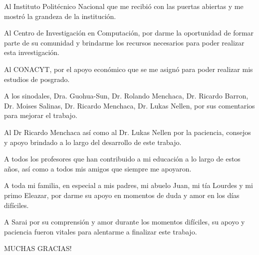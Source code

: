 \begin{acknowledgements}
\addchaptertocentry{\acknowledgementname} 

Al Instituto Politécnico Nacional que me recibió con las puertas abiertas y me mostró la grandeza de la institución. 

Al Centro de Investigación en Computación, por darme la oportunidad de formar parte de su comunidad y brindarme los recursos necesarios para poder realizar esta investigación.

Al CONACYT, por el apoyo económico que se me asignó para poder realizar mis estudios de posgrado.

A los sinodales, Dra. Guohua-Sun, Dr. Rolando Menchaca, Dr. Ricardo Barron, Dr. Moises Salinas, Dr. Ricardo Menchaca, Dr. Lukas Nellen, por sus comentarios para mejorar el trabajo.

Al Dr Ricardo Menchaca así como al Dr. Lukas Nellen por la paciencia, consejos y apoyo brindado a lo largo del desarrollo de este trabajo.

A todos los profesores que han contribuido a mi educación a lo largo de estos años, así como a todos mis amigos que siempre me apoyaron.  

A toda mi familia, en especial a mis padres, mi abuelo Juan, mi tía Lourdes y mi primo Eleazar, por darme su apoyo en momentos de duda y amor en los días difíciles.

A Sarai por su comprensión y amor durante los momentos difíciles, su apoyo y paciencia fueron vitales para alentarme a finalizar este trabajo. 

MUCHAS GRACIAS!

\end{acknowledgements}

\pagebreak